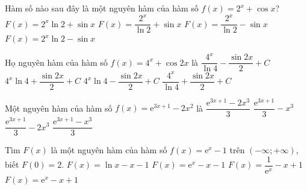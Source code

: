 \begin{ex}%
	Hàm số nào sau đây  là một nguyên hàm của hàm số $f(x) = 2^x + \cos x$?
	\choice 
		 {$F(x) = 2^x \ln 2 + \sin x$}
		 {\True $F(x) = \dfrac{2^x}{\ln 2} + \sin x$}
		{$F(x) = \dfrac{2^x}{\ln 2} - \sin x$} 
		{$F(x) = 2^x \ln  2 - \sin x$}
\end{ex}

\begin{ex}%
	Họ nguyên hàm của hàm  số $f(x)=4^x+\cos 2x$ là
	\choice 
		{$\dfrac{4^x}{\ln 4}-\dfrac{\sin 2x}{2}+C$} 
		{$4^x  \ln 4+\dfrac{\sin 2x}{2}+C$}
		{$4^x  \ln 4-\dfrac{\sin 2x}{2}+C$}
		{\True $\dfrac{4^x}{\ln 4}+\dfrac{\sin 2x}{2}+C$} 
\end{ex}

\begin{ex}%
	Một nguyên hàm của  hàm số $f(x)=\mathrm{e}^{3x+1}-2x^2$ là
	 \choice
		 {$\dfrac{\mathrm{e}^{3x+1}-2x^3}{3}$}
		 {$\dfrac{\mathrm{e}^{3x+1}}{3}-x^3$}
		 {\True $\dfrac{\mathrm{e}^{3x+1}}{3}-2x^3$}
		 {$\dfrac{\mathrm{e}^{3x+1}-x^3}{3}$}
\end{ex}

\begin{ex}%
	Tìm $F(x)$ là một nguyên hàm của hàm số $f(x)=\mathrm{e}^x-1$ trên $(-\infty;+\infty)$, biết  $F(0)=2$.
	 \choice
		 {$F(x)=\ln x-x-1$}
		 {$F(x)=\mathrm{e}^x-x-1$}
		{$F(x)=\dfrac{1}{\mathrm{e}^x}-x+1$} 
		{\True  $F(x)=\mathrm{e}^x-x+1$}
\end{ex}

